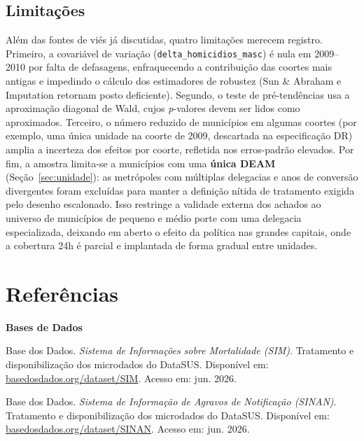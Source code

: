 \documentclass[twocolumn, 10pt]{article}
\begin{document}
\subsection{Limitações}
\label{sec:limit}

Além das fontes de viés já discutidas, quatro limitações merecem registro.
Primeiro, a covariável de variação (\texttt{delta\_homicidios\_masc}) é nula em
2009--2010 por falta de defasagens, enfraquecendo a contribuição das coortes mais
antigas e impedindo o cálculo dos estimadores de robustez (Sun \& Abraham e
Imputation retornam posto deficiente). Segundo, o teste de pré-tendências usa a
aproximação diagonal de Wald, cujos \textit{p}-valores devem ser lidos como
aproximados. Terceiro, o número reduzido de municípios em algumas coortes (por
exemplo, uma única unidade na coorte de 2009, descartada na especificação DR)
amplia a incerteza dos efeitos por coorte, refletida nos erros-padrão elevados.
Por fim, a amostra limita-se a municípios com uma \textbf{única DEAM}
(Seção~\ref{sec:unidade}): as metrópoles com múltiplas delegacias e anos de
conversão divergentes foram excluídas para manter a definição nítida de
tratamento exigida pelo desenho escalonado. Isso restringe a validade externa
dos achados ao universo de municípios de pequeno e médio porte com uma delegacia
especializada, deixando em aberto o efeito da política nas grandes capitais, onde
a cobertura 24h é parcial e implantada de forma gradual entre unidades.

\section*{Referências}
\begingroup
\setlength{\parindent}{-0.4cm}
\setlength{\leftskip}{0.4cm}
\setlength{\parskip}{2pt}
\small

\textbf{Bases de Dados}

Base dos Dados. \textit{Sistema de Informações sobre Mortalidade (SIM)}.
Tratamento e disponibilização dos microdados do DataSUS. Disponível em:
\href{https://basedosdados.org/dataset/5beeec93-cbf3-43f6-9eea-9bee6a0d1683?table=dea823a5-cad7-4014-b77c-4aa33b3b0541}{basedosdados.org/dataset/SIM}.
Acesso em: jun. 2026.

Base dos Dados. \textit{Sistema de Informação de Agravos de Notificação
(SINAN)}. Tratamento e disponibilização dos microdados do DataSUS. Disponível em:
\href{https://basedosdados.org/dataset/f51134c2-5ab9-4bbc-882f-f1034603147a?table=7d2d29c1-cfa8-470b-ab13-a83cf522c5ac}{basedosdados.org/dataset/SINAN}.
Acesso em: jun. 2026.
\end{document}

